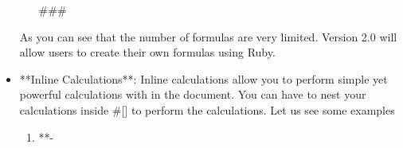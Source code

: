\documentclass{article}
\begin{document}
\begin{itemize}
\begin{enumerate}
###

\end{enumerate}

As you can see that the number of formulas are very limited. Version 2.0 will allow users to create their own formulas using Ruby. 

\item **Inline Calculations**: Inline calculations allow you to perform simple yet powerful calculations with in the document. You can have to nest your calculations inside \#[] 
to perform the calculations. Let us see some examples

\begin{enumerate}

\item **-%

\end{enumerate}

\end{itemize}
\end{document}
